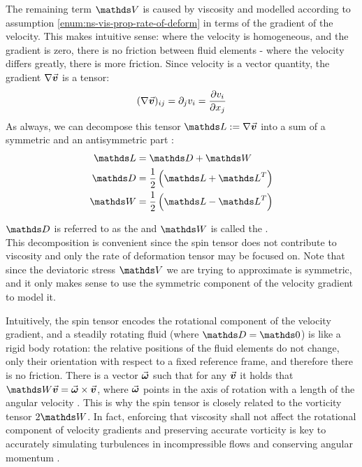 The remaining term $\mat{V}$ is caused by viscosity and modelled according to assumption \ref{enum:ns-vis-prop-rate-of-deform} in terms of the gradient of the velocity. This makes intuitive sense: where the velocity is homogeneous, and the gradient is zero, there is no friction between fluid elements - where the velocity differs greatly, there is more friction. Since velocity is a vector quantity, the gradient $\nabla\vec{\bm{v}}$ is a tensor\autocite*{incompressible-flow-volker}:
\begin{equation}
    (\nabla \vec{\bm{v}})_{ij} = \partial_j v_i = \frac{\partial v_i}{\partial x_j}
\end{equation}
As always, we can decompose this tensor $\mat{L} := \nabla \vek{v} $ into a sum of a symmetric and an antisymmetric part \autocite*{continuum-intro}:
\begin{align}
    \mat{L} & = \mat{D} + \mat{W}                           \\
    \mat{D} & = \frac{1}{2}\left(\mat{L} + \mat{L}^T\right) \\
    \mat{W} & = \frac{1}{2}\left(\mat{L} - \mat{L}^T\right) \\
\end{align}

$\mat{D}$ is referred to as the  and $\mat{W}$ is called the .\\


This decomposition is convenient since the spin tensor does not contribute to viscosity  and only the rate of deformation tensor may be focused on. Note that since the deviatoric stress $\mat{V}$ we are trying to approximate is symmetric, and it only makes sense to use the symmetric component of the velocity gradient to model it.

Intuitively, the spin tensor encodes the rotational component of the velocity gradient, and a steadily rotating fluid (where $\mat{D}=\mat{0}$) is like a rigid body rotation: the relative positions of the fluid elements do not change, only their orientation with respect to a fixed reference frame, and therefore there is no friction. There is a vector $\vec{\bm{\omega}}$ such that for any $\vec{\bm{v}}$ it holds that $\mat{W}\vek{v} = \vek{\omega} \times \vek{v}$, where $\vec{\bm{\omega}}$ points in the axis of rotation with a length of the angular velocity \autocite*{continuum-intro}. This is why the spin tensor is closely related to the vorticity tensor $2\mat{W}$\autocite*{continuum-intro}. In fact, enforcing that viscosity shall not affect the rotational component of velocity gradients and preserving accurate vorticity is key to accurately simulating turbulences in incompressible flows and conserving angular momentum \autocite*{vorticity-micropolar}.

